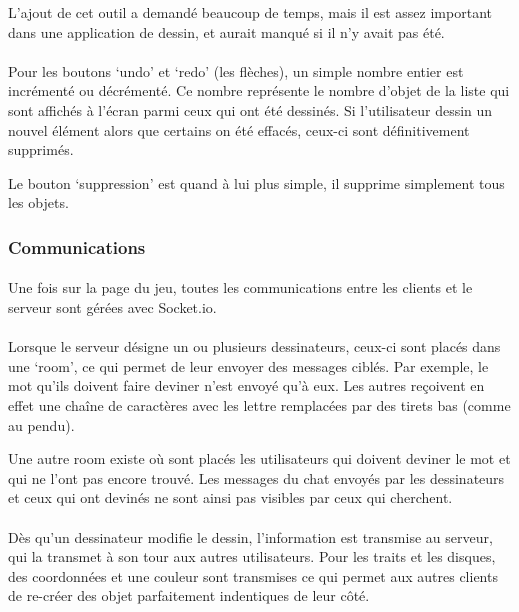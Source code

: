 \documentclass[11pt,a4paper]{article}
\begin{document}
                L'ajout de cet outil a demandé beaucoup de temps,
                mais il est assez important dans une application de dessin,
                et aurait manqué si il n'y avait pas été.
                \paragraph{}
                Pour les boutons `undo' et `redo' (les flèches), un simple nombre entier est incrémenté ou décrémenté.
                Ce nombre représente le nombre d'objet de la liste qui sont affichés à l'écran parmi ceux qui ont été dessinés.
                Si l'utilisateur dessin un nouvel élément alors que certains on été effacés,
                ceux-ci sont définitivement supprimés.

                Le bouton `suppression' est quand à lui plus simple, il supprime simplement tous les objets.
            \subsubsection{Communications}
                \paragraph{}
                Une fois sur la page du jeu, toutes les communications entre les clients et le serveur sont gérées avec Socket.io.
                \paragraph{}
                Lorsque le serveur désigne un ou plusieurs dessinateurs, ceux-ci sont placés dans une `room',
                ce qui permet de leur envoyer des messages ciblés.
                Par exemple, le mot qu'ils doivent faire deviner n'est envoyé qu'à eux.
                Les autres reçoivent en effet une chaîne de caractères avec les lettre remplacées par des tirets bas (comme au pendu).

                Une autre room existe où sont placés les utilisateurs qui doivent deviner le mot et qui ne l'ont pas encore trouvé.
                Les messages du chat envoyés par les dessinateurs et ceux qui ont devinés ne sont ainsi pas visibles par ceux qui cherchent.
                \paragraph{}
                Dès qu'un dessinateur modifie le dessin, l'information est transmise au serveur,
                qui la transmet à son tour aux autres utilisateurs.
                Pour les traits et les disques,
                des coordonnées et une couleur sont transmises ce qui permet aux autres
                clients de re-créer des objet parfaitement indentiques de leur côté.
\end{document}
